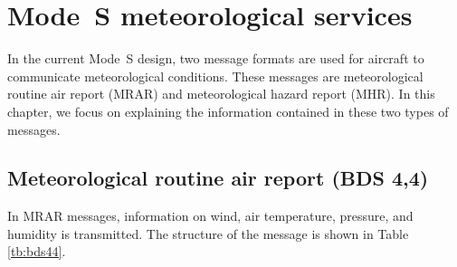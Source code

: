 \chapter{Mode~S meteorological services}

In the current Mode~S design, two message formats are used for aircraft to communicate meteorological conditions. These messages are meteorological routine air report (MRAR) and meteorological hazard report (MHR). In this chapter, we focus on explaining the information contained in these two types of messages.

\section{Meteorological routine air report (BDS 4,4)}

In MRAR messages, information on wind, air temperature, pressure, and humidity is transmitted. The structure of the message is shown in Table \ref{tb:bds44}.


